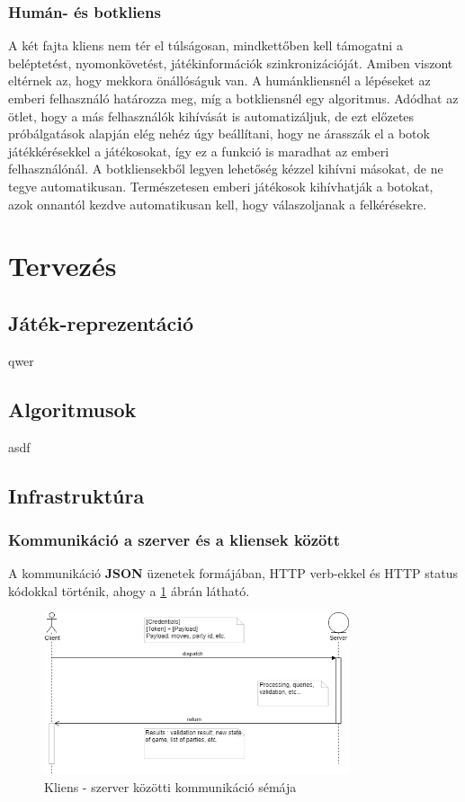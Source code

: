 \documentclass[twoside, a4paper, 12pt]{article}
\begin{document}
\subsubsection{Humán- és botkliens}
A két fajta kliens nem tér el túlságosan, mindkettőben kell támogatni a beléptetést, nyomonkövetést, játékinformációk szinkronizációját. Amiben viszont eltérnek az, hogy mekkora önállóságuk van. A humánkliensnél a lépéseket az emberi felhasználó határozza meg, míg a botkliensnél egy algoritmus. Adódhat az ötlet, hogy a más felhasználók kihívását is automatizáljuk, de ezt előzetes próbálgatások alapján elég nehéz úgy beállítani, hogy ne árasszák el a botok játékkérésekkel a játékosokat, így ez a funkció is maradhat az emberi felhasználónál. A botkliensekből legyen lehetőség kézzel kihívni másokat, de ne tegye automatikusan. Természetesen emberi játékosok kihívhatják a botokat, azok onnantól kezdve automatikusan kell, hogy válaszoljanak a felkérésekre.


\newpage
\section{Tervezés}
\subsection{Játék-reprezentáció}
qwer
\subsection{Algoritmusok}
asdf
\subsection{Infrastruktúra}
\subsubsection{Kommunikáció a szerver és a kliensek között}
A kommunikáció \textbf{JSON} üzenetek formájában, HTTP verb-ekkel és HTTP status kódokkal történik, ahogy a \ref{fig:clientServerCommunication} ábrán látható.

\begin{figure}[htbp]
	\centering
	\includegraphics[width=0.8\textwidth]{img/clientServerCommunication.png}
	\caption{Kliens - szerver közötti kommunikáció sémája}
	\label{fig:clientServerCommunication}
\end{figure}
\end{document}
